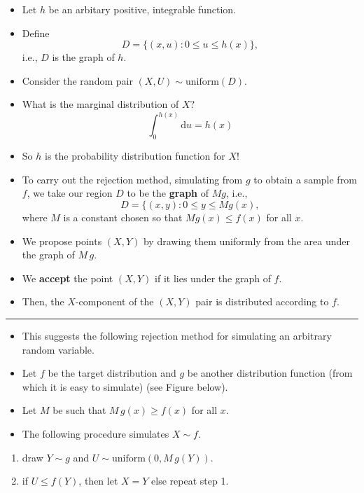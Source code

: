 \documentclass[]{article}
\begin{document}
\begin{itemize}
\item
  Let \(h\) be an arbitary positive, integrable function.
\item
  Define \[D=\{(x,u): 0{\le}u{\le}h(x)\},\] i.e., \(D\) is the graph of
  \(h\).
\item
  Consider the random pair \((X,U)\!\sim\!\mathrm{uniform}(D)\).
\item
  What is the marginal distribution of \(X\)?
  \[\int_0^{h(x)}\!\mathrm{d}u = h(x)\]
\item
  So \(h\) is the probability distribution function for \(X\)!
\item
  To carry out the rejection method, simulating from \(g\) to obtain a
  sample from \(f\), we take our region \(D\) to be the \textbf{graph}
  of \(Mg\), i.e., \[ D = \{(x,y): 0\le y\le Mg(x),\] where \(M\) is a
  constant chosen so that \(Mg(x)\le f(x)\) for all \(x\).
\item
  We propose points \((X,Y)\) by drawing them uniformly from the area
  under the graph of \(M\,g\).
\item
  We \textbf{accept} the point \((X,Y)\) if it lies under the graph of
  \(f\).
\item
  Then, the \(X\)-component of the \((X,Y)\) pair is distributed
  according to \(f\).
\end{itemize}

\begin{center}\rule{0.5\linewidth}{\linethickness}\end{center}

\begin{itemize}
\item
  This suggests the following rejection method for simulating an
  arbitrary random variable.
\item
  Let \(f\) be the target distribution and \(g\) be another distribution
  function (from which it is easy to simulate) (see Figure below).
\item
  Let \(M\) be such that \(M\,g(x){\ge}f(x)\) for all \(x\).
\item
  The following procedure simulates \(X\!\sim\!f\).
\end{itemize}

\begin{enumerate}
\def\labelenumi{\arabic{enumi}.}
\item
  draw \(Y\!\sim\!g\) and \(U\!\sim\!\mathrm{uniform}(0,M\,g(Y))\).
\item
  if \(U{\le}f(Y)\), then let \(X=Y\) else repeat step 1.
\end{enumerate}
\end{document}
